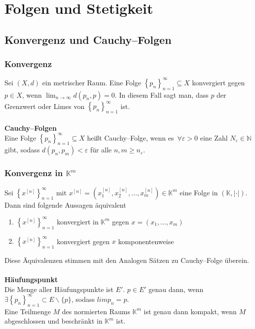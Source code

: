\documentclass[a4paper,12pt]{article}
\begin{document}
\section{Folgen und Stetigkeit}
\subsection{Konvergenz und Cauchy--Folgen}
\subsubsection{Konvergenz}
Sei $\left(X,d\right)$ ein metrischer Raum. Eine Folge $\left\{p_n\right\}_{n=1}^\infty\subseteq X$ konvergiert gegen $p \in X$, wenn $\lim_{n\rightarrow \infty}d\left(p_n,p\right)=0$. In diesem Fall sagt man, dass $p$ der Grenzwert oder Limes von $\left\{p_n\right\}_{n=1}^\infty$ ist.
\\\hfill\\\textbf{Cauchy--Folgen}\\ 
Eine Folge $\left\{p_n\right\}_{n=1}^\infty\subseteq X$ heißt Cauchy--Folge, wenn es $\,\forall \varepsilon >0$ eine Zahl $N_\varepsilon  \in \mathbb{N}$ gibt, sodass $d\left(p_n,p_m\right)<\varepsilon $ für alle $n,m\geq n_\varepsilon $.

\subsubsection{Konvergenz in $\mathbb{K}^m$}
Sei $\left\{x^{[n]}\right\}^\infty_{n=1}$ mit $x^{[n]}=\left(x^{[n]}_1,x^{[n]}_2,\hdots ,x^{[n]}_m\right) \in \mathbb{K}^m$ eine Folge in $\left(\mathbb{K},|\cdot |\right)$. Dann sind folgende Aussagen äquivalent
\begin{enumerate}[label=\arabic*.]
        \item $\left\{x^{[n]}\right\}^\infty_{n=1}$ konvergiert in $\mathbb{K}^m$ gegen $x=(x_1,\hdots ,x_m)$
        \item $\left\{x^{[n]}\right\}^\infty_{n=1}$ konvergiert gegen $x$ komponentenweise
\end{enumerate}
Diese Äquivalenzen stimmen mit den Analogen Sätzen zu Cauchy--Folge überein.
\\\hfill\\\textbf{Häufungspunkt}\\ 
Die Menge aller Häufungspunkte ist $E'$. $p \in E'$ genau dann, wenn $\exists \left\{p_n\right\}_{n=1}^\infty\subset E\backslash\{p\}$, sodass $lim p_n=p$.\\
Eine Teilmenge $M$ des normierten Raums $\mathbb{K}^m$ ist genau dann kompakt, wenn $M$ abgeschlossen und beschränkt in $\mathbb{K}^m$ ist.
\end{document}
